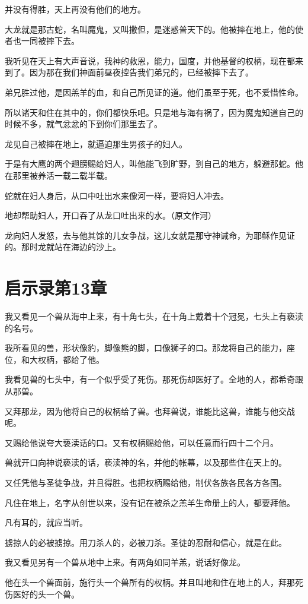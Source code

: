 \documentclass[12pt,oneside]{book}
\begin{document}
并没有得胜，天上再没有他们的地方。

大龙就是那古蛇，名叫魔鬼，又叫撒但，是迷惑普天下的。他被摔在地上，他的使者也一同被摔下去。

我听见在天上有大声音说，我神的救恩，能力，国度，并他基督的权柄，现在都来到了。因为那在我们神面前昼夜控告我们弟兄的，已经被摔下去了。

弟兄胜过他，是因羔羊的血，和自己所见证的道。他们虽至于死，也不爱惜性命。

所以诸天和住在其中的，你们都快乐吧。只是地与海有祸了，因为魔鬼知道自己的时候不多，就气忿忿的下到你们那里去了。

龙见自己被摔在地上，就逼迫那生男孩子的妇人。

于是有大鹰的两个翅膀赐给妇人，叫他能飞到旷野，到自己的地方，躲避那蛇。他在那里被养活一载二载半载。

蛇就在妇人身后，从口中吐出水来像河一样，要将妇人冲去。

地却帮助妇人，开口吞了从龙口吐出来的水。（原文作河）

龙向妇人发怒，去与他其馀的儿女争战，这儿女就是那守神诫命，为耶稣作见证的。那时龙就站在海边的沙上。

\chapter{启示录第13章}
我又看见一个兽从海中上来，有十角七头，在十角上戴着十个冠冕，七头上有亵渎的名号。

我所看见的兽，形状像豹，脚像熊的脚，口像狮子的口。那龙将自己的能力，座位，和大权柄，都给了他。

我看见兽的七头中，有一个似乎受了死伤。那死伤却医好了。全地的人，都希奇跟从那兽。

又拜那龙，因为他将自己的权柄给了兽。也拜兽说，谁能比这兽，谁能与他交战呢。

又赐给他说夸大亵渎话的口。又有权柄赐给他，可以任意而行四十二个月。

兽就开口向神说亵渎的话，亵渎神的名，并他的帐幕，以及那些住在天上的。

又任凭他与圣徒争战，并且得胜。也把权柄赐给他，制伏各族各民各方各国。

凡住在地上，名字从创世以来，没有记在被杀之羔羊生命册上的人，都要拜他。

凡有耳的，就应当听。

掳掠人的必被掳掠。用刀杀人的，必被刀杀。圣徒的忍耐和信心，就是在此。

我又看见另有一个兽从地中上来。有两角如同羊羔，说话好像龙。

他在头一个兽面前，施行头一个兽所有的权柄。并且叫地和住在地上的人，拜那死伤医好的头一个兽。
\end{document}
